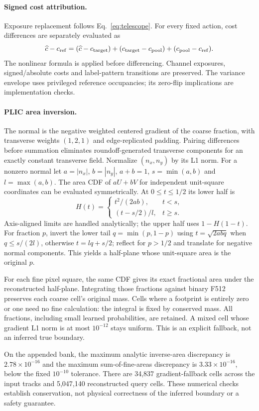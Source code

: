 \paragraph{Signed cost attribution.}
Exposure replacement follows Eq.~\ref{eq:telescope}. For every fixed action, cost
differences are separately evaluated as
\[
\widehat c-c_{\mathrm{ref}}=(\widehat c-c_{\mathrm{target}})
 +(c_{\mathrm{target}}-c_{\mathrm{pool}})+(c_{\mathrm{pool}}-c_{\mathrm{ref}}).
\]
The nonlinear formula is applied before differencing. Channel exposures,
signed/absolute costs and label-pattern transitions are preserved. The variance
envelope uses privileged reference occupancies; its zero-flip implications are
implementation checks.

\paragraph{PLIC area inversion.}
The normal is the negative weighted centered gradient of the coarse fraction,
with transverse weights $(1,2,1)$ and edge-replicated padding. Pairing differences
before summation eliminates roundoff-generated transverse components for an
exactly constant transverse field. Normalize $(n_x,n_y)$ by its L1 norm. For a
nonzero normal let $ a=|n_x|$, $ b=|n_y|$, $ a+b=1$, $ s=\min(a,b)$ and $ l=\max(a,b)$.
The area CDF of $ aU+bV$ for independent unit-square coordinates can be evaluated
symmetrically. At $0\le t\le 1/2$ its lower half is
\[
H(t)=\begin{cases}t^2/(2ab),&t<s,\\(t-s/2)/l,&t\ge s.\end{cases}
\]
Axis-aligned limits are handled analytically; the upper half uses $1-H(1-t)$.
For fraction $ p $, invert the lower tail $ q=\min(p,1-p)$ using
$ t=\sqrt{2abq}$ when $ q\le s/(2l)$, otherwise $ t=lq+s/2$; reflect for $ p>1/2$ and
translate for negative normal components. This yields a half-plane whose
unit-square area is the original $ p $.

For each fine pixel square, the same CDF gives its exact fractional area under
the reconstructed half-plane. Integrating those fractions against binary F512
preserves each coarse cell's original mass. Cells where a footprint is entirely
zero or one need no fine calculation: the integral is fixed by conserved mass.
All fractions, including small learned probabilities, are retained. A mixed
cell whose gradient L1 norm is at most $10^{-12}$ stays uniform. This is an
explicit fallback, not an inferred true boundary.

On the appended bank, the maximum analytic inverse-area discrepancy is
$2.78\times 10^{-16}$ and the maximum sum-of-fine-areas discrepancy is
$3.33\times 10^{-16}$, below the fixed $10^{-10}$ tolerance. There are 34,837
gradient-fallback cells across the input tracks and 5,047,140 reconstructed query
cells. These numerical checks establish conservation, not physical correctness
of the inferred boundary or a safety guarantee.

